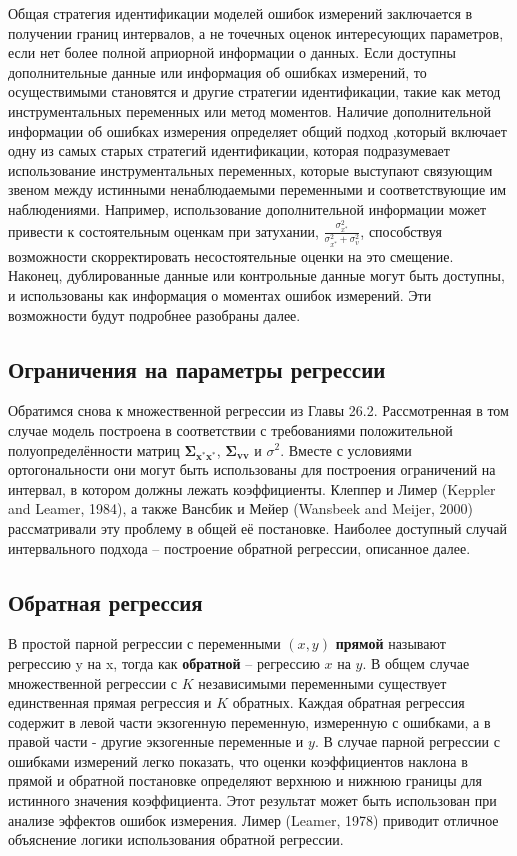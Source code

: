 Общая стратегия идентификации моделей ошибок измерений заключается в получении границ интервалов, а не точечных оценок интересующих параметров, если нет более полной априорной информации о данных. Если доступны дополнительные данные или информация об ошибках измерений, то осуществимыми становятся и другие стратегии идентификации, такие как метод инструментальных переменных или метод моментов. Наличие дополнительной информации об ошибках измерения определяет общий подход ,который включает одну из самых старых стратегий идентификации, которая подразумевает использование инструментальных переменных, которые выступают связующим звеном между истинными ненаблюдаемыми переменными и соответствующие им наблюдениями. Например, использование дополнительной информации может привести к состоятельным оценкам при затухании, $\frac{\sigma^2_{x^*}}{\sigma^2_{x^*}+\sigma^2_{v}}$, способствуя возможности скорректировать несостоятельные оценки на это смещение. Наконец, дублированные данные или контрольные данные могут быть доступны, и использованы как информация о моментах ошибок измерений. Эти возможности будут подробнее разобраны далее.

\subsection{Ограничения на параметры регрессии}
 
Обратимся снова к множественной регрессии из Главы 26.2. Рассмотренная в том случае модель построена в соответствии с требованиями положительной полуопределённости матриц $\mathbf{\Sigma_{x^*x^*}}$, $\mathbf{\Sigma_{vv}}$ и $\sigma^2$. Вместе с условиями ортогональности они могут быть использованы для построения ограничений на интервал, в котором должны лежать коэффициенты. Клеппер и Лимер (Keppler and Leamer, 1984), а также Вансбик и Мейер (Wansbeek and Meijer, 2000) рассматривали эту проблему в общей её постановке. Наиболее доступный случай интервального подхода – построение обратной регрессии, описанное далее.

\subsection*{Обратная регрессия} 

В простой парной регрессии с переменными $(x, y)$ {\bf прямой} называют регрессию y на x, тогда как {\bf обратной} – регрессию $x$ на $y$. В общем случае множественной регрессии с $K$ независимыми переменными существует единственная прямая регрессия и $K$ обратных. Каждая обратная регрессия содержит в левой части экзогенную переменную, измеренную с ошибками, а в правой части - другие экзогенные переменные и $y$. В случае парной регрессии с ошибками измерений легко показать, что оценки коэффициентов наклона в прямой и обратной постановке определяют верхнюю и нижнюю границы для истинного значения коэффициента. Этот результат может быть использован при анализе эффектов ошибок измерения. Лимер (Leamer, 1978) приводит отличное объяснение логики использования обратной регрессии.
 
